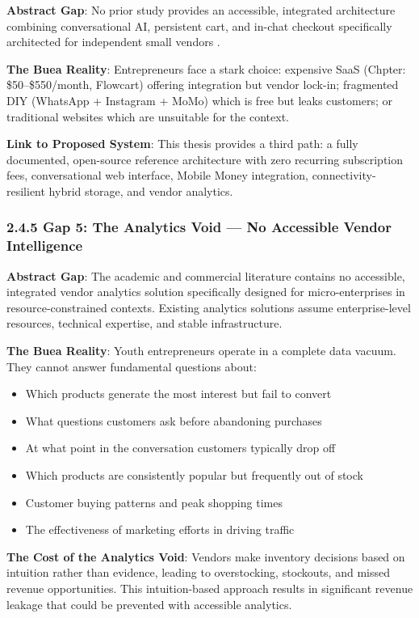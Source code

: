 \documentclass[12pt,a4paper]{article}
\begin{document}
\textbf{Abstract Gap}: No prior study provides an accessible, integrated architecture combining conversational AI, persistent cart, and in-chat checkout specifically architected for independent small vendors \citep{chintalapudi2025}.

\textbf{The Buea Reality}: Entrepreneurs face a stark choice: expensive SaaS (Chpter: \$50--\$550/month, Flowcart) offering integration but vendor lock-in; fragmented DIY (WhatsApp + Instagram + MoMo) which is free but leaks customers; or traditional websites which are unsuitable for the context.

\textbf{Link to Proposed System}: This thesis provides a third path: a fully documented, open-source reference architecture with zero recurring subscription fees, conversational web interface, Mobile Money integration, connectivity-resilient hybrid storage, and vendor analytics.

\subsubsection{2.4.5 Gap 5: The Analytics Void --- No Accessible Vendor Intelligence}

\textbf{Abstract Gap}: The academic and commercial literature contains no accessible, integrated vendor analytics solution specifically designed for micro-enterprises in resource-constrained contexts. Existing analytics solutions assume enterprise-level resources, technical expertise, and stable infrastructure.

\textbf{The Buea Reality}: Youth entrepreneurs operate in a complete data vacuum. They cannot answer fundamental questions about:

\begin{itemize}
    \item Which products generate the most interest but fail to convert
    \item What questions customers ask before abandoning purchases
    \item At what point in the conversation customers typically drop off
    \item Which products are consistently popular but frequently out of stock
    \item Customer buying patterns and peak shopping times
    \item The effectiveness of marketing efforts in driving traffic
\end{itemize}

\textbf{The Cost of the Analytics Void}: Vendors make inventory decisions based on intuition rather than evidence, leading to overstocking, stockouts, and missed revenue opportunities. This intuition-based approach results in significant revenue leakage that could be prevented with accessible analytics.
\end{document}
